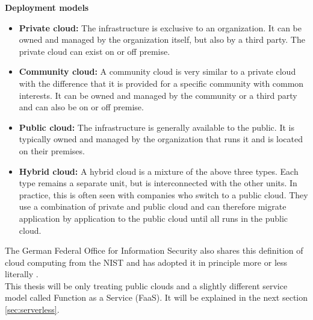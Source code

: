 \textbf{Deployment models} \cite{Mell:2011:SND:2206223}
\begin{itemize}
    \item \textbf{Private cloud:} The infrastructure is exclusive to an organization. It can be owned and managed by the organization itself, but also by a third party. The private cloud can exist on or off premise.
    \item \textbf{Community cloud:} A community cloud is very similar to a private cloud with the difference that it is provided for a specific community with common interests. It can be owned and managed by the community or a third party and can also be on or off premise.
    \item \textbf{Public cloud:} The infrastructure is generally available to the public. It is typically owned and managed by the organization that runs it and is located on their premises.
    \item \textbf{Hybrid cloud:} A hybrid cloud is a mixture of the above three types. Each type remains a separate unit, but is interconnected with the other units. In practice, this is often seen with companies who switch to a public cloud. They use a combination of private and public cloud and can therefore migrate application by application to the public cloud until all runs in the public cloud.
\end{itemize}
The German Federal Office for Information Security also shares this definition of cloud computing from the \gls{NIST} and has adopted it in principle more or less literally \cite{BSICC}.\\
This thesis will be only treating public clouds and a slightly different service model called Function as a Service (\gls{FaaS}). It will be explained in the next section \ref{sec:serverless}.

\newpage
